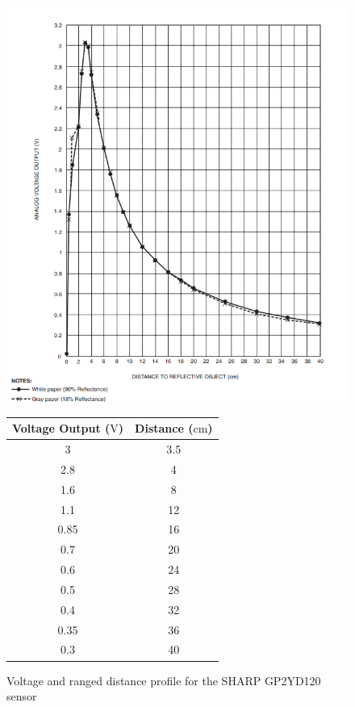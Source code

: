 \documentclass[a4paper]{article}
\begin{document}
\begin{figure}[h]
\centering
\begin{minipage}[c]{0.45\textwidth}
\centering
\includegraphics[scale=0.4]{GP2Y_short}
\caption{Voltage and ranged distance profile for the SHARP GP2YD120 sensor}
\end{minipage}
\hspace{1cm}
\begin{minipage}[c]{0.45\textwidth}
\centering
{}
\begin{tabular}{cc}
\toprule
\textbf{Voltage Output ($\si{\volt}$)} & \textbf{Distance ($\si{\centi\meter}$)}\\
\midrule
3 & 3.5\\
2.8 & 4\\
1.6 & 8\\
1.1 & 12\\
0.85 & 16\\
0.7 & 20\\
0.6 & 24\\
0.5 & 28\\
0.4 & 32\\
0.35 & 36\\
0.3 & 40\\
\bottomrule
\end{tabular}
\end{minipage}
\end{figure}
\end{document}
